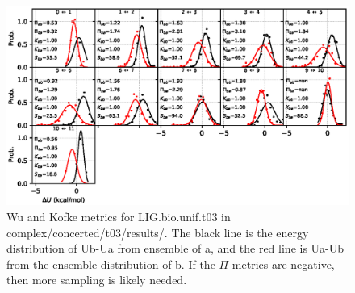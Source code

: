 \documentclass[journal=jctcce,manuscript=article,hyperref=false]{achemso}
\begin{document}
\begin{figure}
\includegraphics[clip,width=6in]{complex.concerted.t03.results..hist.eps}\vspace{-0.3cm}
                        \caption{Wu and Kofke metrics for LIG.bio.unif.t03 in complex/concerted/t03/results/. The black line is the energy distribution of Ub-Ua from ensemble of a, and the red line is Ua-Ub from the ensemble distribution of b. If the $\Pi$ metrics are negative, then more sampling is likely needed.}
\end{figure}
\end{document}
